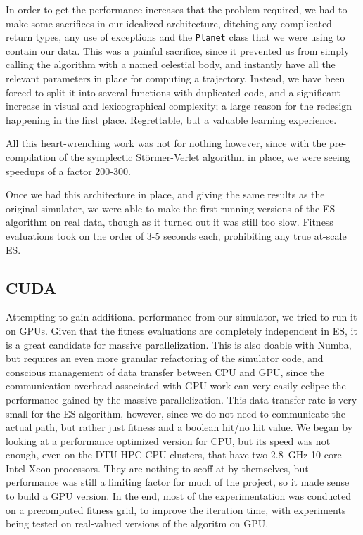 In order to get the performance increases that the problem required, we had to make some sacrifices in our idealized architecture, ditching any complicated return types, any use of exceptions and the \texttt{Planet} class that we were using to contain our data. This was a painful sacrifice, since it prevented us from simply calling the algorithm with a named celestial body, and instantly have all the relevant parameters in place for computing a trajectory. Instead, we have been forced to split it into several functions with duplicated code, and a significant increase in visual and lexicographical complexity; a large reason for the redesign happening in the first place. Regrettable, but a valuable learning experience.

All this heart-wrenching work was not for nothing however, since with the pre-compilation of the symplectic Störmer-Verlet algorithm in place, we were seeing speedups of a factor 200-300. 

Once we had this architecture in place, and giving the same results as the original simulator, we were able to make the first running versions of the ES algorithm on real data, though as it turned out it was still too slow. Fitness evaluations took on the order of 3-5 seconds each, prohibiting any true at-scale ES.

\subsection{CUDA}

Attempting to gain additional performance from our simulator, we tried to run it on GPUs. Given that the fitness evaluations are completely independent in ES, it is a great candidate for massive parallelization. This is also doable with Numba, but requires an even more granular refactoring of the simulator code, and conscious management of data transfer between CPU and GPU, since the communication overhead associated with GPU work can very easily eclipse the performance gained by the massive parallelization. This data transfer rate is very small for the ES algorithm, however, since we do not need to communicate the actual path, but rather just fitness and a boolean hit/no hit value. We began by looking at a performance optimized version for CPU, but its speed was not enough, even on the DTU HPC CPU clusters, that have two \SI{2.8}{\GHz} 10-core Intel Xeon processors. They are nothing to scoff at by themselves, but performance was still a limiting factor for much of the project, so it made sense to build a GPU version. In the end, most of the experimentation was conducted on a precomputed fitness grid, to improve the iteration time, with experiments being tested on real-valued versions of the algoritm on GPU.

